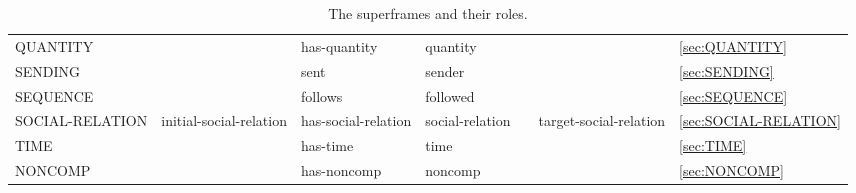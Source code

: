 \documentclass[a4paper]{article}
\newcommand{\fr}[1]{\textsf{#1}}
\newcommand{\rl}[1]{\textsf{#1}}
\begin{document}
\begin{table}
{\begin{tabular}{lllllll}
            \fr{QUANTITY} & & \rl{has-quantity} & \rl{quantity} & & & \ref{sec:QUANTITY} \\
            \fr{SENDING} & & \rl{sent} & \rl{sender} & & & \ref{sec:SENDING} \\
            \fr{SEQUENCE} & & \rl{follows} & \rl{followed} & & & \ref{sec:SEQUENCE} \\
            \fr{SOCIAL-RELATION} & initial-social-relation & \rl{has-social-relation} & \rl{social-relation} & & target-social-relation & \ref{sec:SOCIAL-RELATION} \\
            \fr{TIME} & & \rl{has-time} & \rl{time} & & & \ref{sec:TIME} \\
            \midrule
            \fr{NONCOMP} & & \rl{has-noncomp} & \rl{noncomp} & & & \ref{sec:NONCOMP} \\
            \bottomrule
        \end{tabular}
    }
    \caption{The superframes and their roles.}
    \label{tab:superframes}
\end{table}
\end{document}
